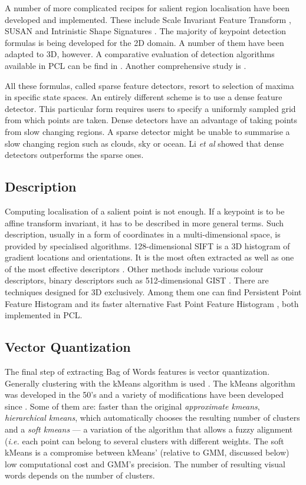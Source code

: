 \documentclass[a4paper,12pt]{article}
\begin{document}
	A number of more complicated recipes for salient region localisation have been developed and implemented. These include Scale Invariant Feature Transform \cite{sift_keypoint}, SUSAN \cite{susan_keypoint} and Intrinistic Shape Signatures \cite{iss_keypoint}. The majority of keypoint detection formulas is being developed for the 2D domain. A number of them have been adapted to 3D, however. A comparative evaluation of detection algorithms available in PCL can be find in \cite{pcl_keypoint_comparision}. Another comprehensive study is \cite{3d_keypoint_eval}.
	
	All these formulas, called sparse feature detectors, resort to selection of maxima in specific state spaces. An entirely different scheme is to use a dense feature detector. This particular form requires users to specify a uniformly sampled grid from which points are taken. Dense detectors have an advantage of taking points from slow changing regions. A sparse detector might be unable to summarise a slow changing region such as clouds, sky or ocean. Li \emph{et al} showed that dense detectors outperforms the sparse ones.
	
	
	
\subsection{Description}

	Computing localisation of a salient point is not enough. If a keypoint is to be affine transform invariant, it has to be described in more general terms. Such description, usually in a form of coordinates in a multi-dimensional space, is provided by specialised algorithms. 128-dimensional SIFT \cite{sift_features} is a 3D histogram of gradient locations and orientations. It is the most often extracted as well as one of the most effective descriptors \cite{tsai2012bag}. Other methods include various colour descriptors, binary descriptors such as 512-dimensional GIST \cite{ponce2011cv}. There are techniques designed for 3D exclusively. Among them one can find Persistent Point Feature Histogram \cite{pfh_rusu2008} and its faster alternative Fast Point Feature Histogram \cite{fpfh_rusu2009}, both implemented in PCL.

\subsection{Vector Quantization}

	The final step of extracting Bag of Words features is vector quantization. Generally clustering with the kMeans algorithm is used \cite{tsai2012bag}. The kMeans algorithm was developed in the 50's and a variety of modifications have been developed since \cite{kmeans_jain2010data}. Some of them are: faster than the original \emph{approximate kmeans}, \emph{hierarchical kmeans}, which automatically chooses the resulting number of clusters and a  \emph{soft kmeans} --- a variation of the algorithm that allows a fuzzy alignment (\textit{i.e.} each point can belong to several clusters with different weights. The soft kMeans is a compromise between kMeans' (relative to GMM, discussed below) low computational cost and GMM's precision. The number of resulting visual words depends on the number of clusters.
	
\end{document}
